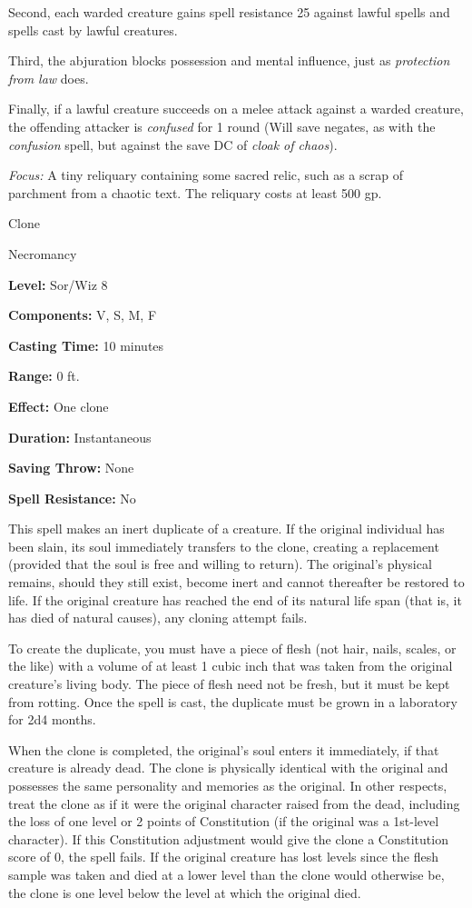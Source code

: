 \documentclass{article}
\begin{document}
Second, each warded creature gains spell resistance 25 against lawful spells and 
spells cast by lawful creatures.

Third, the abjuration blocks possession and mental influence, just as \textit{protection 
from law }does.

Finally, if a lawful creature succeeds on a melee attack against a warded creature, 
the offending attacker is \textit{confused }for 1 round (Will save negates, as 
with the \textit{confusion }spell, but against the save DC of \textit{cloak of 
chaos}).

\textit{Focus: }A tiny reliquary containing some sacred relic, such as a scrap 
of parchment from a chaotic text. The reliquary costs at least 500 gp.

\vspace{12pt}
Clone

Necromancy

\textbf{Level:} Sor/Wiz 8

\textbf{Components:} V, S, M, F

\textbf{Casting Time:} 10 minutes

\textbf{Range:} 0 ft.

\textbf{Effect:} One clone

\textbf{Duration:} Instantaneous

\textbf{Saving Throw:} None

\textbf{Spell Resistance:} No

This spell makes an inert duplicate of a creature. If the original individual has 
been slain, its soul immediately transfers to the clone, creating a replacement 
(provided that the soul is free and willing to return). The original's physical 
remains, should they still exist, become inert and cannot thereafter be restored 
to life. If the original creature has reached the end of its natural life span 
(that is, it has died of natural causes), any cloning attempt fails.

To create the duplicate, you must have a piece of flesh (not hair, nails, scales, 
or the like) with a volume of at least 1 cubic inch that was taken from the original 
creature's living body. The piece of flesh need not be fresh, but it must be kept 
from rotting. Once the spell is cast, the duplicate must be grown in a laboratory 
for 2d4 months.

When the clone is completed, the original's soul enters it immediately, if that 
creature is already dead. The clone is physically identical with the original and 
possesses the same personality and memories as the original. In other respects, 
treat the clone as if it were the original character raised from the dead, including 
the loss of one level or 2 points of Constitution (if the original was a 1st-level 
character). If this Constitution adjustment would give the clone a Constitution 
score of 0, the spell fails. If the original creature has lost levels since the 
flesh sample was taken and died at a lower level than the clone would otherwise 
be, the clone is one level below the level at which the original died.
\end{document}
